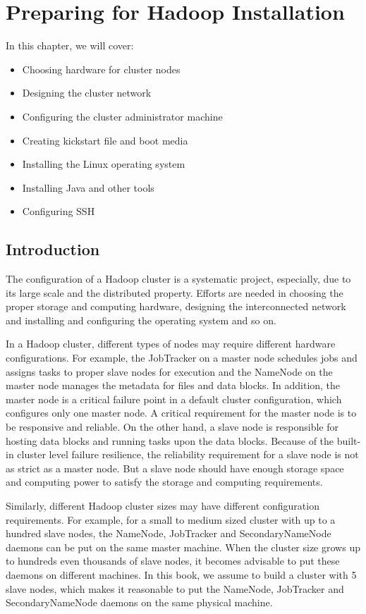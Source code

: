 \chapter{Preparing for Hadoop Installation}
In this chapter, we will cover:
\begin{itemize}
  \item Choosing hardware for cluster nodes
  \item Designing the cluster network
  \item Configuring the cluster administrator machine
  \item Creating kickstart file and boot media
  \item Installing the Linux operating system
  \item Installing Java and other tools
  \item Configuring SSH
\end{itemize}
\section{Introduction}
The configuration of a Hadoop cluster is a systematic project, especially, due to its large scale and the distributed property. Efforts are needed in choosing the proper storage and computing hardware, designing the interconnected network and installing and configuring the operating system and so on.

In a Hadoop cluster, different types of nodes may require different hardware configurations. For example, the JobTracker on a master node schedules jobs and assigns tasks to proper slave nodes for execution and the NameNode on the master node manages the metadata for files and data blocks. In addition, the master node is a critical failure point in a default cluster configuration, which configures only one master node. A critical requirement for the master node is to be responsive and reliable. On the other hand, a slave node is responsible for hosting data blocks and running tasks upon the data blocks. Because of the built-in cluster level failure resilience, the reliability requirement for a slave node is not as strict as a master node. But a slave node should have enough storage space and computing power to satisfy the storage and computing requirements.

Similarly, different Hadoop cluster sizes may have different configuration requirements. For example, for a small to medium sized cluster with up to a hundred slave nodes, the NameNode, JobTracker and SecondaryNameNode daemons can be put on the same master machine. When the cluster size grows up to hundreds even thousands of slave nodes, it becomes advisable to put these daemons on different machines. In this book, we assume to build a cluster with 5 slave nodes, which makes it reasonable to put the NameNode, JobTracker and SecondaryNameNode daemons on the same physical machine.

